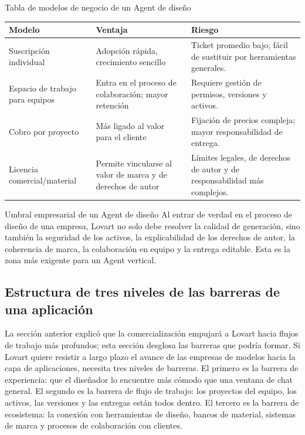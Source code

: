 \begin{knowledgebox}{Tabla de modelos de negocio de un Agent de diseño}
\begin{tabularx}{\textwidth}{p{}p{}X}
\toprule
Modelo & Ventaja & Riesgo \\
\midrule
Suscripción individual & Adopción rápida, crecimiento sencillo & Ticket promedio bajo; fácil de sustituir por herramientas generales. \\
Espacio de trabajo para equipos & Entra en el proceso de colaboración; mayor retención & Requiere gestión de permisos, versiones y activos. \\
Cobro por proyecto & Más ligado al valor para el cliente & Fijación de precios compleja; mayor responsabilidad de entrega. \\
Licencia comercial/material & Permite vincularse al valor de marca y de derechos de autor & Límites legales, de derechos de autor y de responsabilidad más complejos. \\
\bottomrule
\end{tabularx}
\end{knowledgebox}

\begin{importantbox}{Umbral empresarial de un Agent de diseño}
Al entrar de verdad en el proceso de diseño de una empresa, Lovart no solo debe resolver la calidad de generación, sino también la seguridad de los activos, la explicabilidad de los derechos de autor, la coherencia de marca, la colaboración en equipo y la entrega editable. Esta es la zona más exigente para un Agent vertical.
\end{importantbox}

\subsection{Estructura de tres niveles de las barreras de una aplicación}

La sección anterior explicó que la comercialización empujará a Lovart hacia flujos de trabajo más profundos; esta sección desglosa las barreras que podría formar. Si Lovart quiere resistir a largo plazo el avance de las empresas de modelos hacia la capa de aplicaciones, necesita tres niveles de barreras. El primero es la barrera de experiencia: que el diseñador lo encuentre más cómodo que una ventana de chat general. El segundo es la barrera de flujo de trabajo: los proyectos del equipo, los activos, las versiones y las entregas están todos dentro. El tercero es la barrera de ecosistema: la conexión con herramientas de diseño, bancos de material, sistemas de marca y procesos de colaboración con clientes.


